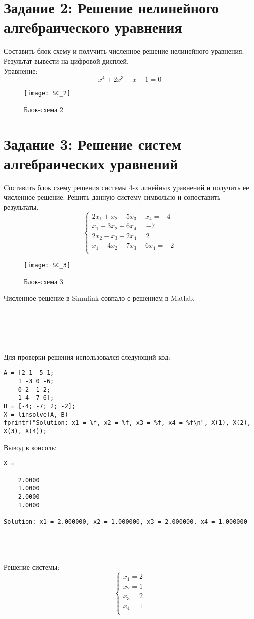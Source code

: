 \documentclass{article}
\begin{document}
\section*{Задание 2: Решение нелинейного алгебраического уравнения}
Составить блок схему и получить численное решение нелинейного уравнения. Результат вывести на цифровой дисплей.\\
Уравнение: $$x^4+2x^3-x-1=0$$

\begin{figure}[!h]
	\centering
	\texttt{[image: SC\_2]}
	\caption{Блок-схема 2}
	\label{fig:mpr}
\end{figure}

\section*{Задание 3: Решение систем алгебраических уравнений}
Cоставить блок схему решения системы 4-х линейных уравнений и получить ее численное решение. Решить данную систему символьно и сопоставить результаты.~\\

$$\begin{cases}
	2x_1+x_2-5x_3+x_4=-4\\
	x_1-3x_2-6x_4=-7\\
	2x_2-x_3+2x_4=2\\
	x_1+4x_2-7x_3+6x_4=-2\\
\end{cases}$$
\begin{figure}[!h]
	\centering
	\texttt{[image: SC\_3]}
	\caption{Блок-схема 3}
	\label{fig:sc3}
\end{figure}
Численное решение в Simulink совпало с решением в Matlab.
~\\
~\\\\
~\\
~\\\\ Для проверки решения использовался следующий код:
\begin{lstlisting}
A = [2 1 -5 1;
    1 -3 0 -6;
    0 2 -1 2;
    1 4 -7 6];
B = [-4; -7; 2; -2];
X = linsolve(A, B)
fprintf("Solution: x1 = %f, x2 = %f, x3 = %f, x4 = %f\n", X(1), X(2), X(3), X(4));
\end{lstlisting}

Вывод в консоль:
\begin{lstlisting}
X =

    2.0000
    1.0000
    2.0000
    1.0000

Solution: x1 = 2.000000, x2 = 1.000000, x3 = 2.000000, x4 = 1.000000

\end{lstlisting}
~\\
~\\\\ 
Решение системы:
$$\begin{cases}
	x_1=2\\
	x_2=1\\
	x_3=2\\
	x_4=1\\
\end{cases}$$
\end{document}
